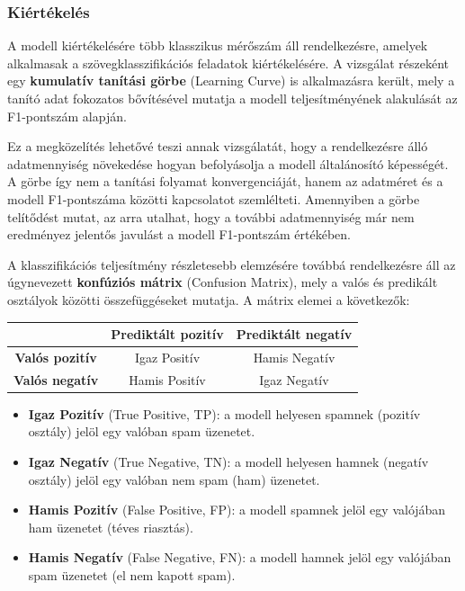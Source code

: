 \subsubsection{Kiértékelés}

A modell kiértékelésére több klasszikus mérőszám áll rendelkezésre, amelyek alkalmasak a szövegklasszifikációs 
feladatok kiértékelésére. A vizsgálat részeként egy \textbf{kumulatív tanítási görbe} (Learning Curve) is 
alkalmazásra került, mely a tanító adat fokozatos bővítésével mutatja a modell teljesítményének alakulását az F1-pontszám alapján.

Ez a megközelítés lehetővé teszi annak vizsgálatát, hogy a rendelkezésre álló adatmennyiség növekedése hogyan befolyásolja a modell általánosító képességét. 
A görbe így nem a tanítási folyamat konvergenciáját, hanem az adatméret és a modell F1-pontszáma közötti kapcsolatot szemlélteti. 
Amennyiben a görbe telítődést mutat, az arra utalhat, hogy a további adatmennyiség már nem eredményez jelentős javulást a modell F1-pontszám értékében.

A klasszifikációs teljesítmény részletesebb elemzésére továbbá rendelkezésre áll az úgynevezett \textbf{konfúziós mátrix} (Confusion Matrix), mely a 
valós és predikált osztályok közötti összefüggéseket mutatja. A mátrix elemei a következők: 

\begin{table}[H]
  \centering
  \begin{tabular}{|c|c|c|}
    \hline
    & \textbf{Prediktált pozitív} & \textbf{Prediktált negatív} \\
    \hline
    \textbf{Valós pozitív} & Igaz Positív & Hamis Negatív \\
    \hline
    \textbf{Valós negatív} & Hamis Positív & Igaz Negatív \\
    \hline
  \end{tabular}
\end{table}

\begin{itemize}
  \item \textbf{Igaz Pozitív} (True Positive, TP): a modell helyesen spamnek (pozitív osztály) jelöl egy valóban spam üzenetet.
  \item \textbf{Igaz Negatív} (True Negative, TN): a modell helyesen hamnek (negatív osztály) jelöl egy valóban nem spam (ham) üzenetet.
  \item \textbf{Hamis Pozitív} (False Positive, FP): a modell spamnek jelöl egy valójában ham üzenetet (téves riasztás).
  \item \textbf{Hamis Negatív} (False Negative, FN): a modell hamnek jelöl egy valójában spam üzenetet (el nem kapott spam).
\end{itemize}

